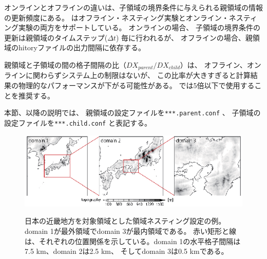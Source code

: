 オンラインとオフラインの違いは、子領域の境界条件に与えられる親領域の情報の更新頻度にある。
\scalerm はオフライン・ネスティング実験とオンライン・ネスティング実験の両方をサポートしている。
オンラインの場合、
子領域の境界条件の更新は親領域のタイムステップ($\Delta t$) 毎に行われるが、
オフラインの場合、親領域のhitoryファイルの出力間隔に依存する。

親領域と子領域の間の格子間隔の比（$DX_{parent}/DX_{child}$）は、
オフライン、オンラインに関わらずシステム上の制限はないが、
この比率が大きすぎると計算結果の物理的なパフォーマンスが下がる可能性がある。
\scalerm では5倍以下で使用することを推奨する。

本節、以降の説明では、
親領域の設定ファイルを\verb|***.parent.conf| 、
子領域の設定ファイルを\verb|***.child.conf| と表記する。

\begin{figure}[t]
\begin{center}
  \includegraphics[width=1.0\hsize]{./figure/nesting_sample.eps}\\
  \caption{日本の近畿地方を対象領域とした領域ネスティング設定の例。 
    domain 1が最外領域でdomain 3が最内領域である。
    赤い矩形と線は、それぞれの位置関係を示している。domain 1の水平格子間隔は7.5 km、domain 2は2.5 km、
    そしてdomain 3は0.5 kmである。}
  \label{fig_nestsample}
\end{center}
\end{figure}


~~\\
~~\\


\subsection{\SubsecOflineNesting} \label{subsec:nest_offline}

